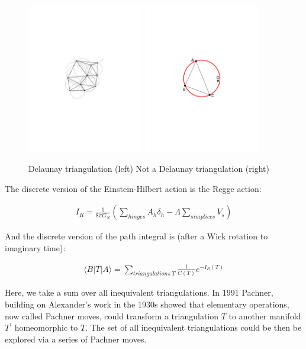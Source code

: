 \documentclass[12pt]{article}
\begin{document}
\begin{figure}
  \begin{center}
  \includegraphics[width=2in]{DT1.pdf}
   \includegraphics[width=2in]{NDT.pdf}
  \caption{Delaunay triangulation (left) Not a Delaunay triangulation (right) \label{DT}}
  \end{center}
\end{figure}

The discrete version of the Einstein-Hilbert action is the Regge action:

\begin{align}
  I_{R}=\frac{1}{8\pi G_{N}}\left(\sum\limits_{hinges}A_{h}\delta_{h}-\Lambda\sum\limits_{simplices}V_{s}\right)\label{equation:Regge-Action}
\end{align}

And the discrete version of the path integral is (after a Wick rotation to imaginary time):

\begin{align}
  \langle B|T|A\rangle=\sum\limits_{triangulations\ T}\frac{1}{C(T)}e^{-I_{R}(T)} \label{CDT1}
\end{align}

Here, we take a sum over all inequivalent triangulations. In 1991 Pachner\cite{pachner_p.l._1991}, building on Alexander's work in the 1930s\cite{alexander_combinatorial_1930}
showed that elementary operations, now called Pachner moves, could transform a triangulation $T$ to another manifold $T^{\prime}$ homeomorphic to $T$. The set of all inequivalent triangulations could be then be explored via a series of Pachner moves.\cite{gross_elementary_1992}
\end{document}
